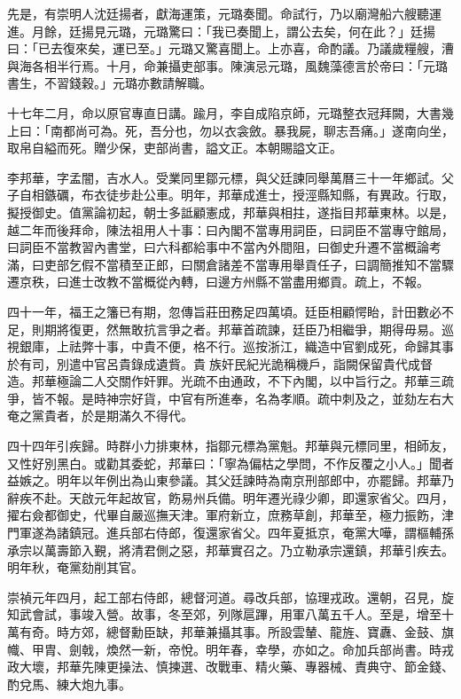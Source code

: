 \begin{pinyinscope}
先是，有崇明人沈廷揚者，獻海運策，元璐奏聞。命試行，乃以廟灣船六艘聽運進。月餘，廷揚見元璐，元璐驚曰：「我已奏聞上，謂公去矣，何在此？」廷揚曰：「已去復來矣，運已至。」元璐又驚喜聞上。上亦喜，命酌議。乃議歲糧艘，漕與海各相半行焉。十月，命兼攝吏部事。陳演忌元璐，風魏藻德言於帝曰：「元璐書生，不習錢穀。」元璐亦數請解職。

十七年二月，命以原官專直日講。踰月，李自成陷京師，元璐整衣冠拜闕，大書幾上曰：「南都尚可為。死，吾分也，勿以衣衾斂。暴我屍，聊志吾痛。」遂南向坐，取帛自縊而死。贈少保，吏部尚書，謚文正。本朝賜謚文正。

李邦華，字孟闇，吉水人。受業同里鄒元標，與父廷諫同舉萬曆三十一年鄉試。父子自相鏃礪，布衣徒步赴公車。明年，邦華成進士，授涇縣知縣，有異政。行取，擬授御史。值黨論初起，朝士多詆顧憲成，邦華與相拄，遂指目邦華東林。以是，越二年而後拜命，陳法祖用人十事：曰內閣不當專用詞臣，曰詞臣不當專守館局，曰詞臣不當教習內書堂，曰六科都給事中不當內外間阻，曰御史升遷不當概論考滿，曰吏部乞假不當積至正郎，曰關倉諸差不當專用舉貢任子，曰調簡推知不當驟遷京秩，曰進士改教不當概從內轉，曰邊方州縣不當盡用鄉貢。疏上，不報。

四十一年，福王之籓已有期，忽傳旨莊田務足四萬頃。廷臣相顧愕眙，計田數必不足，則期將復更，然無敢抗言爭之者。邦華首疏諫，廷臣乃相繼爭，期得毋易。巡視銀庫，上祛弊十事，中貴不便，格不行。巡按浙江，織造中官劉成死，命歸其事於有司，別遣中官呂貴錄成遺貲。貴族奸民紀光詭稱機戶，詣闕保留貴代成督造。邦華極論二人交關作奸罪。光疏不由通政，不下內閣，以中旨行之。邦華三疏爭，皆不報。是時神宗好貨，中官有所進奉，名為孝順。疏中刺及之，並劾左右大奄之黨貴者，於是期滿久不得代。

四十四年引疾歸。時群小力排東林，指鄒元標為黨魁。邦華與元標同里，相師友，又性好別黑白。或勸其委蛇，邦華曰：「寧為偏枯之學問，不作反覆之小人。」聞者益嫉之。明年以年例出為山東參議。其父廷諫時為南京刑部郎中，亦罷歸。邦華乃辭疾不赴。天啟元年起故官，飭易州兵備。明年遷光祿少卿，即還家省父。四月，擢右僉都御史，代畢自嚴巡撫天津。軍府新立，庶務草創，邦華至，極力振飭，津門軍遂為諸鎮冠。進兵部右侍郎，復還家省父。四年夏抵京，奄黨大嘩，謂樞輔孫承宗以萬壽節入覲，將清君側之惡，邦華實召之。乃立勒承宗還鎮，邦華引疾去。明年秋，奄黨劾削其官。

崇禎元年四月，起工部右侍郎，總督河道。尋改兵部，協理戎政。還朝，召見，旋知武會試，事竣入營。故事，冬至郊，列隊扈蹕，用軍八萬五千人。至是，增至十萬有奇。時方郊，總督勳臣缺，邦華兼攝其事。所設雲輦、龍旌、寶纛、金鼓、旗幟、甲胄、劍戟，煥然一新，帝悅。明年春，幸學，亦如之。命加兵部尚書。時戎政大壞，邦華先陳更操法、慎揀選、改戰車、精火藥、專器械、責典守、節金錢、酌兌馬、練大炮九事。


\end{pinyinscope}
